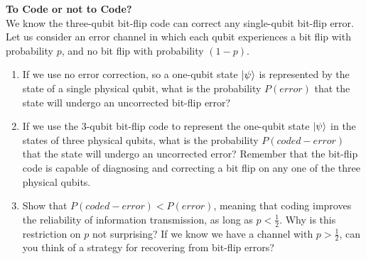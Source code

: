 \documentclass[12pt,letterpaper,boxed,cm]{hmcpset}
\begin{document}

\begin{problem}[1)]
    \textbf{To Code or not to Code?}\\
    We know the three-qubit bit-flip code can correct any single-qubit bit-flip error.  Let us consider an error channel in which each qubit experiences a bit flip with probability $p$, and no bit flip with probability $(1-p)$.
    \begin{enumerate}[label=(\alph*)]
        \item If we use no error correction, so a one-qubit state $\ket{\psi}$ is represented by the state of a single physical qubit, what is the probability $P(error)$ that the state will undergo an uncorrected bit-flip error?
        \item If we use the 3-qubit bit-flip code to represent the one-qubit state $\ket{\psi}$ in the states of three physical qubits, what is the probability $P(coded-error)$ that the state will undergo an uncorrected error?  Remember that the bit-flip code is capable of diagnosing and correcting a bit flip on any one of the three physical qubits.
        \item Show that $P(coded-error)<P(error)$, meaning that coding improves the reliability of information transmission, as long as $p<\frac{1}{2}$.  Why is this restriction on $p$ not surprising?  If we know we have a channel with $p>\frac{1}{2}$, can you think of a strategy for recovering from bit-flip errors?
    \end{enumerate}
\end{problem}

\begin{solution}
    \vfill
\end{solution}
\newpage
\end{document}
